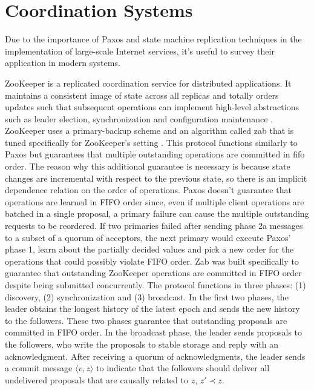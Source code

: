 \section{Coordination Systems} \label{Coordination Systems}
Due to the importance of Paxos and state machine replication techniques in the implementation of large-scale Internet services, it's useful to survey their application in modern systems.\par
ZooKeeper is a replicated coordination service for distributed applications. It maintains a consistent image of state across all replicas and totally orders updates such that subsequent operations can implement high-level abstractions such as leader election, synchronization and configuration maintenance \cite{Hunt2010}. ZooKeeper uses a primary-backup scheme and an algorithm called \acrfull{zab} that is tuned specifically for ZooKeeper's setting \cite{Junqueira2011}. This protocol functions similarly to Paxos but guarantees that multiple outstanding operations are committed in \acrfull{fifo} order. The reason why this additional guarantee is necessary is because state changes are incremental with respect to the previous state, so there is an implicit dependence relation on the order of operations. Paxos doesn't guarantee that operations are learned in 	FIFO order since, even if multiple client operations are batched in a single proposal, a primary failure can cause the multiple outstanding requests to be reordered. If two primaries failed after sending phase 2a messages to a subset of a quorum of acceptors, the next primary would execute Paxos' phase 1, learn about the partially decided values and pick a new order for the operations that could possibly violate FIFO order. Zab was built specifically to guarantee that outstanding ZooKeeper operations are committed in FIFO order despite being submitted concurrently. The protocol functions in three phases: (1) discovery, (2) synchronization and (3) broadcast. In the  first two phases, the leader obtains the longest history of the latest epoch and sends the new history to the followers. These two phases guarantee that outstanding proposals are committed in FIFO order. In the broadcast phase, the leader sends proposals to the followers, who write the proposals to stable storage and reply with an acknowledgment. After receiving a quorum of acknowledgments, the leader sends a commit message $\langle v,z \rangle$ to indicate that the followers should deliver all undelivered proposals that are causally related to $z$, $z' \prec z$. \par
